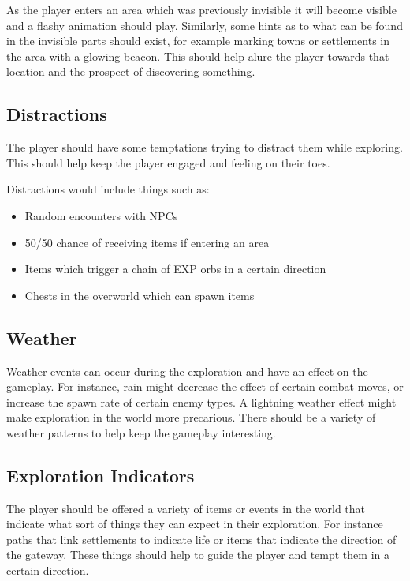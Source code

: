 \documentclass[a4paper]{scrreprt}
\begin{document}
As the player enters an area which was previously invisible it will become visible and a flashy animation should play.
Similarly, some hints as to what can be found in the invisible parts should exist, for example marking towns or settlements in the area with a glowing beacon.
This should help alure the player towards that location and the prospect of discovering something.

\subsection{Distractions}
The player should have some temptations trying to distract them while exploring.
This should help keep the player engaged and feeling on their toes.

Distractions would include things such as:

    \begin{itemize}
        \item Random encounters with NPCs
        \item 50/50 chance of receiving items if entering an area
        \item Items which trigger a chain of EXP orbs in a certain direction
        \item Chests in the overworld which can spawn items
    \end{itemize}

\subsection{Weather}
Weather events can occur during the exploration and have an effect on the gameplay.
For instance, rain might decrease the effect of certain combat moves, or increase the spawn rate of certain enemy types.
A lightning weather effect might make exploration in the world more precarious.
There should be a variety of weather patterns to help keep the gameplay interesting.

\subsection{Exploration Indicators}
The player should be offered a variety of items or events in the world that indicate what sort of things they can expect in their exploration.
For instance paths that link settlements to indicate life or items that indicate the direction of the gateway.
These things should help to guide the player and tempt them in a certain direction.
\end{document}
